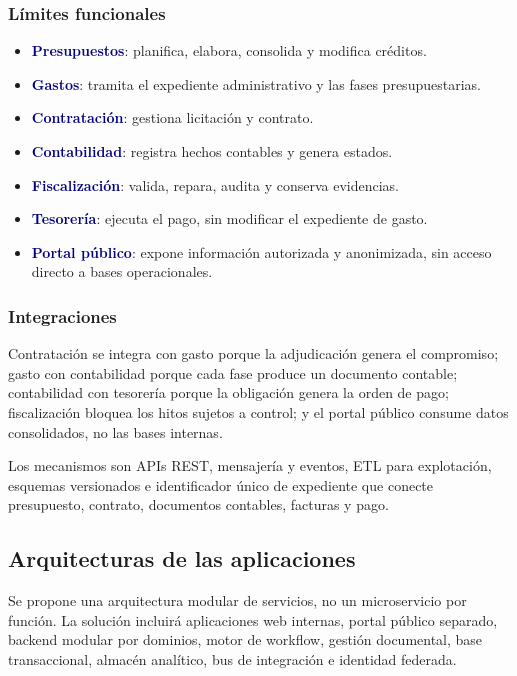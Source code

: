 \documentclass[11pt,a4paper]{article}
\newcommand{\key}[1]{\textbf{\textcolor{navy}{#1}}}
\begin{document}
\subsubsection{Límites funcionales}
\begin{itemize}
\item \key{Presupuestos}: planifica, elabora, consolida y modifica créditos.
\item \key{Gastos}: tramita el expediente administrativo y las fases presupuestarias.
\item \key{Contratación}: gestiona licitación y contrato.
\item \key{Contabilidad}: registra hechos contables y genera estados.
\item \key{Fiscalización}: valida, repara, audita y conserva evidencias.
\item \key{Tesorería}: ejecuta el pago, sin modificar el expediente de gasto.
\item \key{Portal público}: expone información autorizada y anonimizada, sin acceso directo a bases operacionales.
\end{itemize}

\subsubsection{Integraciones}
Contratación se integra con gasto porque la adjudicación genera el compromiso; gasto con contabilidad porque cada fase produce un documento contable; contabilidad con tesorería porque la obligación genera la orden de pago; fiscalización bloquea los hitos sujetos a control; y el portal público consume datos consolidados, no las bases internas.

Los mecanismos son APIs REST, mensajería y eventos, ETL para explotación, esquemas versionados e identificador único de expediente que conecte presupuesto, contrato, documentos contables, facturas y pago.

\subsection{Arquitecturas de las aplicaciones}

Se propone una arquitectura modular de servicios, no un microservicio por función. La solución incluirá aplicaciones web internas, portal público separado, backend modular por dominios, motor de workflow, gestión documental, base transaccional, almacén analítico, bus de integración e identidad federada.
\end{document}
